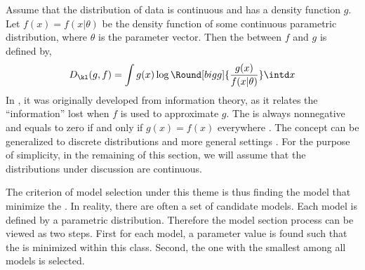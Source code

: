 Assume that the distribution of data is continuous and has a density function
$g$. Let $f(x) = f(x|\theta)$ be the density function of some continuous
parametric distribution, where $\theta$ is the parameter vector. Then the \kld
between $f$ and $g$ is defined by,
\begin{equation}
  D_{\kl}(g,f) = \int g(x)\log\Round[bigg]{\frac{g(x)}{f(x|\theta)}}\intd x
  \label{eq:kl}
\end{equation}
In \cite{Kullback:1951va}, it was originally developed from information
theory, as it relates the ``information'' lost when $f$ is used to approximate
$g$. The \kld is always nonnegative and equals to zero if and only if $g(x) =
f(x)$ everywhere \cite[][sec.~6.8]{Burnham:2002wc}. The concept can be
generalized to discrete distributions and more general settings
\cite[][sec.~2.1.3]{Burnham:2002wc}. For the purpose of simplicity, in the
remaining of this section, we will assume that the distributions under
discussion are continuous.

The criterion of model selection under this theme is thus finding the model
that minimize the \kld. In reality, there are often a set of candidate models.
Each model is defined by a parametric distribution. Therefore the model
section process can be viewed as two steps. First for each model, a parameter
value is found such that the \kld is minimized within this class. Second, the
one with the smallest \kld among all models is selected.

